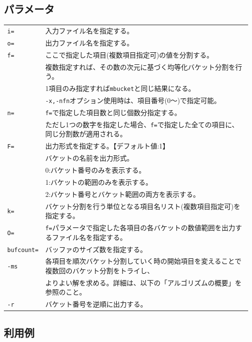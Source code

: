 \subsection*{パラメータ}
\begin{table}[hbt]
{\small
\begin{tabular}{ll}
\verb|i=|    & 入力ファイル名を指定する。\\
\verb|o=|    & 出力ファイル名を指定する。\\
\verb|f=|    & ここで指定した項目(複数項目指定可)の値を分割する。\\
             & 複数指定すれば、その数の次元に基づく均等化バケット分割を行う。\\
             & 1項目のみ指定すれば\verb|mbucket|と同じ結果になる。\\
             & \verb|-x,-nfn|オプション使用時は、項目番号(0〜)で指定可能。\\
\verb|n=|    & \verb|f=|で指定した項目数と同じ個数分指定する。\\
             & ただし1つの数字を指定した場合、\verb|f=|で指定した全ての項目に、同じ分割数が適用される。\\
\verb|F=|    & 出力形式を指定する。【デフォルト値:1】\\
             & バケットの名前を出力形式。\\
             & 0:バケット番号のみを表示する。\\
             & 1:バケットの範囲のみを表示する。\\
             & 2:バケット番号とバケット範囲の両方を表示する。\\
\verb|k=|    & バケット分割を行う単位となる項目名リスト(複数項目指定可)を指定する。\\
\verb|O=|    & \verb|f=|パラメータで指定した各項目の各バケットの数値範囲を出力するファイル名を指定する。\\
\verb|bufcount=| & バッファのサイズ数を指定する。 \\
\verb|-ms|   & 各項目を順次バケット分割していく時の開始項目を変えることで複数回のバケット分割をトライし、\\
             & よりよい解を求める。詳細は、以下の「アルゴリズムの概要」を参照のこと。\\
\verb|-r|    & バケット番号を逆順に出力する。\\
\end{tabular} 
}
\end{table} 

\subsection*{利用例}

